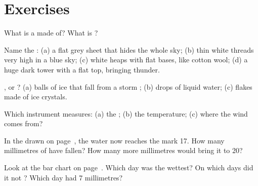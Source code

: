 \section{Exercises}

\begin{exercise}[$\star$]\label{exo:g4:clouds-rain-snow:1}
What is a  made of? What is ?
\end{exercise}

\begin{exercise}[$\star$]\label{exo:g4:clouds-rain-snow:2}
Name the : (a) a flat grey sheet that hides the whole sky; (b) thin
white threads very high in a blue sky; (c) white heaps with flat bases, like
cotton wool; (d) a huge dark tower with a flat top, bringing thunder.
\end{exercise}

\begin{exercise}[$\star$]\label{exo:g4:clouds-rain-snow:3}
,  or ? (a) balls of ice that fall from a storm ; (b) drops
of liquid water; (c) flakes made of ice crystals.
\end{exercise}

\begin{exercise}[$\star$]\label{exo:g4:clouds-rain-snow:4}
Which instrument measures: (a) the ; (b) the temperature; (c) where the
wind comes from?
\end{exercise}

\begin{exercise}[$\star$]\label{exo:g4:clouds-rain-snow:5}
In the  drawn on page~\pageref{fig:g4:clouds-rain-snow:gauge}, the water now
reaches the mark 17. How many millimetres of  have fallen? How many
more millimetres would bring it to 20?
\end{exercise}

\begin{exercise}[$\star$]\label{exo:g4:clouds-rain-snow:6}
Look at the bar chart on page~\pageref{fig:g4:clouds-rain-snow:bars}. Which day
was the wettest? On which days did it not ? Which day had 7
millimetres?
\end{exercise}


